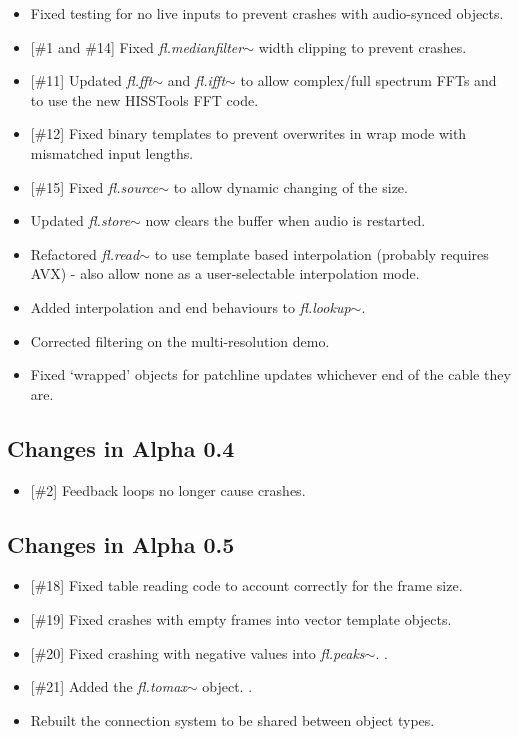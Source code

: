 \documentclass{article}
\newcommand{\flobject}[1]{\textit{fl.#1$\sim$}}
\begin{document}
\begin{itemize}
\item Fixed testing for no live inputs to prevent crashes with audio-synced objects.
\item {[\#1 and \#14]} Fixed \flobject{medianfilter} width clipping to prevent crashes.
\item {[\#11]} Updated \flobject{fft} and \flobject{ifft} to allow complex/full spectrum FFTs and to use the new HISSTools FFT code.
\item {[\#12]} Fixed binary templates to prevent overwrites in wrap mode with mismatched input lengths.
\item {[\#15]} Fixed \flobject{source} to allow dynamic changing of the size.
\item Updated \flobject{store} now clears the buffer when audio is restarted.
\item Refactored \flobject{read} to use template based interpolation (probably requires AVX) - also allow none as a user-selectable interpolation mode.
\item Added interpolation and end behaviours to \flobject{lookup}.
\item Corrected filtering on the multi-resolution demo.
\item Fixed `wrapped' objects for patchline updates whichever end of the cable they are.
\end{itemize}

\subsection{Changes in Alpha 0.4}
\vspace{0.1in}

\begin{itemize}
\item {[\#2]} Feedback loops no longer cause crashes.
\end{itemize}

\subsection{Changes in Alpha 0.5}
\vspace{0.1in}
    
\begin{itemize}
\item {[\#18]} Fixed table reading code to account correctly for the frame size.
\item {[\#19]} Fixed crashes with empty frames into vector template objects.
\item {[\#20]} Fixed crashing with negative values into \flobject{peaks}.
.\item {[\#21]} Added the \flobject{tomax} object.
.\item Rebuilt the connection system to be shared between object types.
\end{itemize}
\end{document}
